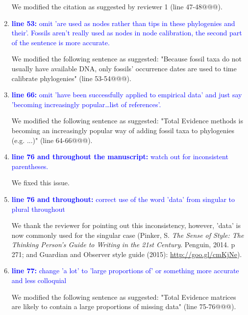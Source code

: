 \documentclass[12pt,letterpaper]{article}
\begin{document}
\begin{enumerate}
We modified the citation as suggested by reviewer 1 (line 47-48@@@).

\item{\textcolor{blue}{\textbf{line 53:} omit 'are used as nodes rather than tips in these phylogenies and their'. Fossils aren't really used as nodes in node calibration, the second part of the sentence is more accurate.}}

We modified the following sentence as suggested: "Because fossil taxa do not usually have available DNA, only fossils' occurrence dates are used to time calibrate phylogenies" (line 53-54@@@).

\item{\textcolor{blue}{\textbf{line 66:} omit 'have been successfully applied to empirical data' and just say 'becoming increasingly popular…list of references'. }}

We modified the following sentence as suggested: "Total Evidence methods is becoming an increasingly popular way of adding fossil taxa to phylogenies (e.g. ...)" (line 64-66@@@).

\item{\textcolor{blue}{\textbf{line 76 and throughout the manuscript:} watch out for inconsistent parentheses.}}

We fixed this issue.

\item{\textcolor{blue}{\textbf{line 76 and throughout:} correct use of the word 'data' from singular to plural throughout}}

We thank the reviewer for pointing out this inconsistency, however, 'data' is now commonly used for the singular case (Pinker, S. \textit{The Sense of Style: The Thinking Person's Guide to Writing in the 21st Century}. Penguin, 2014. p 271; and Guardian and Observer style guide (2015): \url{http://goo.gl/cmKjNe}).

\item{\textcolor{blue}{\textbf{line 77:} change 'a lot' to 'large proportions of' or something more accurate and less colloquial}}

We modified the following sentence as suggested: "Total Evidence matrices are likely to contain a large proportions of missing data" (line 75-76@@@).


\end{enumerate}
\end{document}
